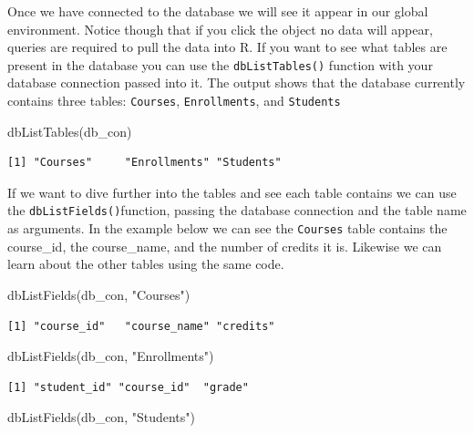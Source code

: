 \documentclass[
  letterpaper,
  DIV=11,
  numbers=noendperiod]{scrreprt}
\newenvironment{Shaded}{\begin{snugshade}}{\end{snugshade}}
\newcommand{\FunctionTok}[1]{\textcolor[rgb]{0.28,0.35,0.67}{#1}}
\newcommand{\NormalTok}[1]{\textcolor[rgb]{0.00,0.23,0.31}{#1}}
\newcommand{\StringTok}[1]{\textcolor[rgb]{0.13,0.47,0.30}{#1}}
\begin{document}
Once we have connected to the database we will see it appear in our
global environment. Notice though that if you click the object no data
will appear, queries are required to pull the data into R. If you want
to see what tables are present in the database you can use the
\texttt{dbListTables()} function with your database connection passed
into it. The output shows that the database currently contains three
tables: \texttt{Courses}, \texttt{Enrollments}, and \texttt{Students}

\begin{Shaded}
\begin{Highlighting}[]
\FunctionTok{dbListTables}\NormalTok{(db\_con)}
\end{Highlighting}
\end{Shaded}

\begin{verbatim}
[1] "Courses"     "Enrollments" "Students"   
\end{verbatim}

If we want to dive further into the tables and see each table contains
we can use the \texttt{dbListFields()}function, passing the database
connection and the table name as arguments. In the example below we can
see the \texttt{Courses} table contains the course\_id, the
course\_name, and the number of credits it is. Likewise we can learn
about the other tables using the same code.

\begin{Shaded}
\begin{Highlighting}[]
\FunctionTok{dbListFields}\NormalTok{(db\_con, }\StringTok{"Courses"}\NormalTok{)}
\end{Highlighting}
\end{Shaded}

\begin{verbatim}
[1] "course_id"   "course_name" "credits"    
\end{verbatim}

\begin{Shaded}
\begin{Highlighting}[]
\FunctionTok{dbListFields}\NormalTok{(db\_con, }\StringTok{"Enrollments"}\NormalTok{)}
\end{Highlighting}
\end{Shaded}

\begin{verbatim}
[1] "student_id" "course_id"  "grade"     
\end{verbatim}

\begin{Shaded}
\begin{Highlighting}[]
\FunctionTok{dbListFields}\NormalTok{(db\_con, }\StringTok{"Students"}\NormalTok{)}
\end{Highlighting}
\end{Shaded}
\end{document}
